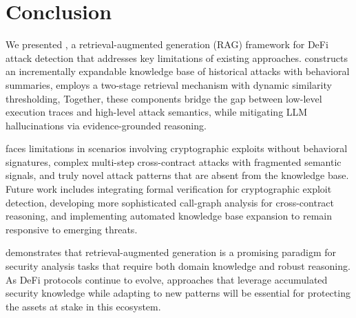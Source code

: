 
\section{Conclusion}
\label{sec:conclusion}
We presented \approach{}, a retrieval-augmented generation (RAG) framework for DeFi attack detection that addresses key limitations of existing approaches. \approach{} constructs an incrementally expandable knowledge base of historical attacks with behavioral summaries, employs a two-stage retrieval mechanism with dynamic similarity thresholding,  Together, these components bridge the gap between low-level execution traces and high-level attack semantics, while mitigating LLM hallucinations via evidence-grounded reasoning.


\approach{} faces limitations in scenarios involving cryptographic exploits without behavioral signatures, complex multi-step cross-contract attacks with fragmented semantic signals, and truly novel attack patterns that are absent from the knowledge base. Future work includes integrating formal verification for cryptographic exploit detection, developing more sophisticated call-graph analysis for cross-contract reasoning, and implementing automated knowledge base expansion to remain responsive to emerging threats.

\approach{} demonstrates that retrieval-augmented generation is a promising paradigm for security analysis tasks that require both domain knowledge and robust reasoning. As DeFi protocols continue to evolve, approaches that leverage accumulated security knowledge while adapting to new patterns will be essential for protecting the assets at stake in this ecosystem.
